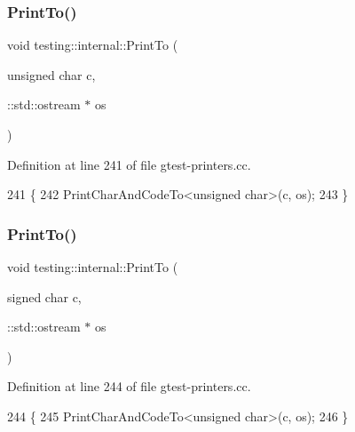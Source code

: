 \subsubsection{\texorpdfstring{Print\+To()}{PrintTo()}\hspace{0.1cm}{\footnotesize\ttfamily [5/20]}}
{\footnotesize\ttfamily void testing\+::internal\+::\+Print\+To (\begin{DoxyParamCaption}\item[{unsigned char}]{c,  }\item[{\+::std\+::ostream $\ast$}]{os }\end{DoxyParamCaption})}



Definition at line 241 of file gtest-\/printers.\+cc.


\begin{DoxyCode}
241                                               \{
242   PrintCharAndCodeTo<unsigned char>(c, os);
243 \}
\end{DoxyCode}
\mbox{\label{namespacetesting_1_1internal_ad453af399370e394881079c243abacb4}} 
\subsubsection{\texorpdfstring{Print\+To()}{PrintTo()}\hspace{0.1cm}{\footnotesize\ttfamily [6/20]}}
{\footnotesize\ttfamily void testing\+::internal\+::\+Print\+To (\begin{DoxyParamCaption}\item[{signed char}]{c,  }\item[{\+::std\+::ostream $\ast$}]{os }\end{DoxyParamCaption})}



Definition at line 244 of file gtest-\/printers.\+cc.


\begin{DoxyCode}
244                                             \{
245   PrintCharAndCodeTo<unsigned char>(c, os);
246 \}
\end{DoxyCode}
\mbox{\label{namespacetesting_1_1internal_a476bd3d411d4f129620aaf8999c257c0}} 
